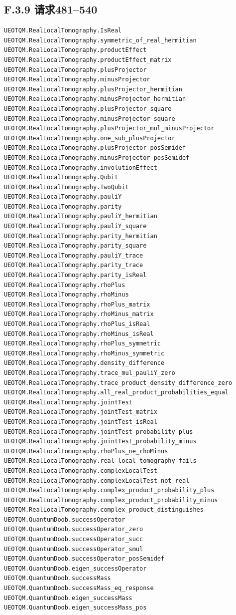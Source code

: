 \documentclass[
  11pt,
  oneside]{book}
\begin{document}
\hypertarget{f.3.9-ux8bf7ux6c42481540}{%
\subsection{F.3.9 请求481--540}\label{f.3.9-ux8bf7ux6c42481540}}

\begin{Verbatim}[breaklines,breakanywhere,fontsize=\scriptsize]
UEOTQM.RealLocalTomography.IsReal
UEOTQM.RealLocalTomography.symmetric_of_real_hermitian
UEOTQM.RealLocalTomography.productEffect
UEOTQM.RealLocalTomography.productEffect_matrix
UEOTQM.RealLocalTomography.plusProjector
UEOTQM.RealLocalTomography.minusProjector
UEOTQM.RealLocalTomography.plusProjector_hermitian
UEOTQM.RealLocalTomography.minusProjector_hermitian
UEOTQM.RealLocalTomography.plusProjector_square
UEOTQM.RealLocalTomography.minusProjector_square
UEOTQM.RealLocalTomography.plusProjector_mul_minusProjector
UEOTQM.RealLocalTomography.one_sub_plusProjector
UEOTQM.RealLocalTomography.plusProjector_posSemidef
UEOTQM.RealLocalTomography.minusProjector_posSemidef
UEOTQM.RealLocalTomography.involutionEffect
UEOTQM.RealLocalTomography.Qubit
UEOTQM.RealLocalTomography.TwoQubit
UEOTQM.RealLocalTomography.pauliY
UEOTQM.RealLocalTomography.parity
UEOTQM.RealLocalTomography.pauliY_hermitian
UEOTQM.RealLocalTomography.pauliY_square
UEOTQM.RealLocalTomography.parity_hermitian
UEOTQM.RealLocalTomography.parity_square
UEOTQM.RealLocalTomography.pauliY_trace
UEOTQM.RealLocalTomography.parity_trace
UEOTQM.RealLocalTomography.parity_isReal
UEOTQM.RealLocalTomography.rhoPlus
UEOTQM.RealLocalTomography.rhoMinus
UEOTQM.RealLocalTomography.rhoPlus_matrix
UEOTQM.RealLocalTomography.rhoMinus_matrix
UEOTQM.RealLocalTomography.rhoPlus_isReal
UEOTQM.RealLocalTomography.rhoMinus_isReal
UEOTQM.RealLocalTomography.rhoPlus_symmetric
UEOTQM.RealLocalTomography.rhoMinus_symmetric
UEOTQM.RealLocalTomography.density_difference
UEOTQM.RealLocalTomography.trace_mul_pauliY_zero
UEOTQM.RealLocalTomography.trace_product_density_difference_zero
UEOTQM.RealLocalTomography.all_real_product_probabilities_equal
UEOTQM.RealLocalTomography.jointTest
UEOTQM.RealLocalTomography.jointTest_matrix
UEOTQM.RealLocalTomography.jointTest_isReal
UEOTQM.RealLocalTomography.jointTest_probability_plus
UEOTQM.RealLocalTomography.jointTest_probability_minus
UEOTQM.RealLocalTomography.rhoPlus_ne_rhoMinus
UEOTQM.RealLocalTomography.real_local_tomography_fails
UEOTQM.RealLocalTomography.complexLocalTest
UEOTQM.RealLocalTomography.complexLocalTest_not_real
UEOTQM.RealLocalTomography.complex_product_probability_plus
UEOTQM.RealLocalTomography.complex_product_probability_minus
UEOTQM.RealLocalTomography.complex_product_distinguishes
UEOTQM.QuantumDoob.successOperator
UEOTQM.QuantumDoob.successOperator_zero
UEOTQM.QuantumDoob.successOperator_succ
UEOTQM.QuantumDoob.successOperator_smul
UEOTQM.QuantumDoob.successOperator_posSemidef
UEOTQM.QuantumDoob.eigen_successOperator
UEOTQM.QuantumDoob.successMass
UEOTQM.QuantumDoob.successMass_eq_response
UEOTQM.QuantumDoob.eigen_successMass
UEOTQM.QuantumDoob.eigen_successMass_pos
\end{Verbatim}
\end{document}
